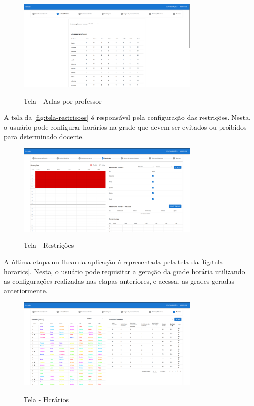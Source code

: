 \begin{figure}[!htb]
	\centering
	\caption{Tela - Aulas por professor}
	\includegraphics[width=0.8\textwidth]{./dados/figuras/tela_aulas}
	\label{fig:tela-aulas}
\end{figure}
\newpage

A tela da \autoref{fig:tela-restricoes} é responsável pela configuração das restrições. Nesta, o usuário pode configurar horários na grade que devem ser evitados ou proibidos para determinado docente.

\begin{figure}[!htb]
	\centering
	\caption{Tela - Restrições}
	\includegraphics[width=0.8\textwidth]{./dados/figuras/tela_restricoes}
	\label{fig:tela-restricoes}
\end{figure}

A última etapa no fluxo da aplicação é representada pela tela da \autoref{fig:tela-horarios}. Nesta, o usuário pode requisitar a geração da grade horária utilizando as configurações realizadas nas etapas anteriores, e acessar as grades geradas anteriormente.

\begin{figure}[!htb]
	\centering
	\caption{Tela - Horários}
	\includegraphics[width=0.8\textwidth]{./dados/figuras/tela_horarios}
	\label{fig:tela-horarios}
\end{figure}
\newpage

